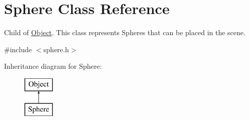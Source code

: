 \hypertarget{class_sphere}{}\section{Sphere Class Reference}
\label{class_sphere}


Child of \mbox{\hyperlink{class_object}{Object}}. This class represents Spheres that can be placed in the scene.  




{\ttfamily \#include $<$sphere.\+h$>$}

Inheritance diagram for Sphere\+:\begin{figure}[H]
\begin{center}
\leavevmode
\includegraphics[height=2.000000cm]{class_sphere}
\end{center}
\end{figure}
